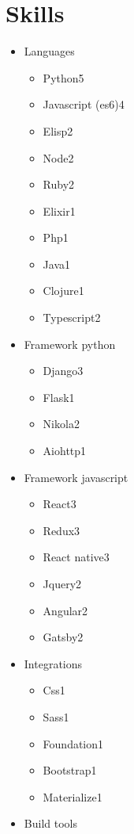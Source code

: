 \documentclass[11pt,letter,sans]{moderncv}
\begin{document}
\section{Skills}
  \begin{itemize}
      \item Languages
      \begin{itemize}
\item Python\hfill 5\item Javascript (es6)\hfill 4\item Elisp\hfill 2\item Node\hfill 2\item Ruby\hfill 2\item Elixir\hfill 1\item Php\hfill 1\item Java\hfill 1\item Clojure\hfill 1\item Typescript\hfill 2\end{itemize}
      \item Framework python
      \begin{itemize}
\item Django\hfill 3\item Flask\hfill 1\item Nikola\hfill 2\item Aiohttp\hfill 1\end{itemize}
      \item Framework javascript
      \begin{itemize}
\item React\hfill 3\item Redux\hfill 3\item React native\hfill 3\item Jquery\hfill 2\item Angular\hfill 2\item Gatsby\hfill 2\end{itemize}
      \item Integrations
      \begin{itemize}
\item Css\hfill 1\item Sass\hfill 1\item Foundation\hfill 1\item Bootstrap\hfill 1\item Materialize\hfill 1\end{itemize}
      \item Build tools
      \begin{itemize}

\end{itemize}
\end{itemize}
\end{document}

